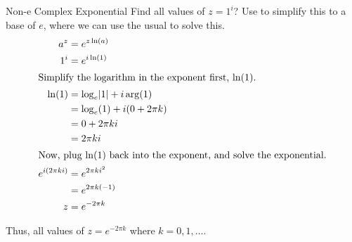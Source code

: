 \begin{example}[Lecture 3]{Non-e Complex Exponential}
  Find all values of $z=1^{i}$?
  \tcblower{}
  Use  to simplify this to a base of $e$, where we can use the usual  to solve this.
  \begin{align*}
    a^{z} &= e^{z \ln(a)} \\
    1^{i} &= e^{i \ln(1)} \\
    \intertext{Simplify the logarithm in the exponent first, $\ln(1)$.}
    \ln(1) &= \log_{e} \lvert 1 \rvert + i \arg(1) \\
          &= \log_{e}(1) + i (0 + 2\pi k) \\
          &= 0 + 2\pi k i \\
          &= 2\pi k i \\
    \intertext{Now, plug $\ln(1)$ back into the exponent, and solve the exponential.}
    e^{i (2\pi k i)} &= e^{2\pi k i^{2}} \\
          &= e^{2\pi k (-1)} \\
    z &= e^{-2\pi k}
  \end{align*}

  Thus, all values of $z = e^{-2\pi k}$ where $k = 0, 1, \ldots$.
\end{example}


